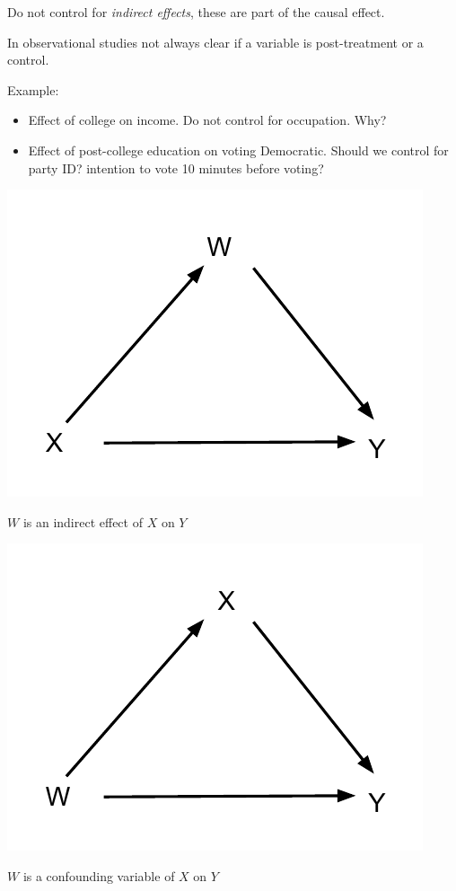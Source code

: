 \documentclass{tufte-handout}
\begin{document}
Do not control for \emph{indirect effects}, these are part of the causal
effect.

In observational studies not always clear if a variable is
post-treatment or a control.

Example:

\begin{itemize}
\itemsep1pt\parskip0pt
\item
  Effect of college on income. Do not control for occupation. Why?
\item
  Effect of post-college education on voting Democratic. Should we
  control for party ID? intention to vote 10 minutes before voting?
\end{itemize}

\begin{marginfigure}
\includegraphics{images/Mediating_Variable_Diagram.pdf}
\caption{$W$ is an indirect effect of $X$ on $Y$}
\end{marginfigure}

\begin{marginfigure}
\includegraphics{images/Confounding_Variable_Diagram.pdf}
\caption{$W$ is a confounding variable of $X$ on $Y$}
\end{marginfigure}
\end{document}
